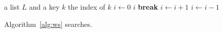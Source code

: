 \documentclass{article}
\begin{document}
\begin{algorithm}
\caption{Widget search}\label{alg:ws}
\begin{algorithmic}[1]
\Require a list $L$ and a key $k$
\Ensure the index of $k$
\State $i \gets 0$
    \State \Return $i$
    \State \textbf{break}
  \Else
    \State $i \gets i + 1$
  \EndIf
\EndFor
{} \State $i \gets i - 1$ \EndWhile
{} \State {} \EndFunction
\State {}
\end{algorithmic}
\end{algorithm}
Algorithm~\ref{alg:ws} searches.
\end{document}
